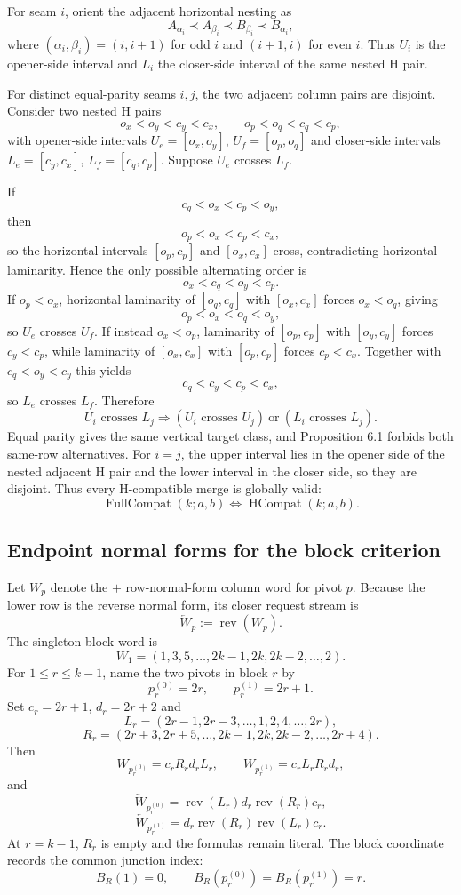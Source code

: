 \documentclass[11pt]{article}
\theoremstyle{definition}
\theoremstyle{remark}
\begin{document}
For seam \(i\), orient the adjacent horizontal nesting as \[
A_{\alpha_i}\prec A_{\beta_i}\prec B_{\beta_i}\prec B_{\alpha_i},
\] where \((\alpha_i,\beta_i)=(i,i+1)\) for odd \(i\) and \((i+1,i)\)
for even \(i\). Thus \(U_i\) is the opener-side interval and \(L_i\) the
closer-side interval of the same nested H pair.

For distinct equal-parity seams \(i,j\), the two adjacent column pairs
are disjoint. Consider two nested H pairs \[
o_x<o_y<c_y<c_x,
\qquad
o_p<o_q<c_q<c_p,
\] with opener-side intervals \(U_e=[o_x,o_y]\), \(U_f=[o_p,o_q]\) and
closer-side intervals \(L_e=[c_y,c_x]\), \(L_f=[c_q,c_p]\). Suppose
\(U_e\) crosses \(L_f\).

If \[
c_q<o_x<c_p<o_y,
\] then \[
o_p<o_x<c_p<c_x,
\] so the horizontal intervals \([o_p,c_p]\) and \([o_x,c_x]\) cross,
contradicting horizontal laminarity. Hence the only possible alternating
order is \[
o_x<c_q<o_y<c_p.
\] If \(o_p<o_x\), horizontal laminarity of \([o_q,c_q]\) with
\([o_x,c_x]\) forces \(o_x<o_q\), giving \[
o_p<o_x<o_q<o_y,
\] so \(U_e\) crosses \(U_f\). If instead \(o_x<o_p\), laminarity of
\([o_p,c_p]\) with \([o_y,c_y]\) forces \(c_y<c_p\), while laminarity of
\([o_x,c_x]\) with \([o_p,c_p]\) forces \(c_p<c_x\). Together with
\(c_q<o_y<c_y\) this yields \[
c_q<c_y<c_p<c_x,
\] so \(L_e\) crosses \(L_f\). Therefore \[
U_i\text{ crosses }L_j
\Longrightarrow
(U_i\text{ crosses }U_j)\ \text{or}\ (L_i\text{ crosses }L_j).
\] Equal parity gives the same vertical target class, and Proposition
6.1 forbids both same-row alternatives. For \(i=j\), the upper interval
lies in the opener side of the nested adjacent H pair and the lower
interval in the closer side, so they are disjoint. Thus every
H-compatible merge is globally valid: \[
\operatorname{FullCompat}(k;a,b)
\iff
\operatorname{HCompat}(k;a,b).
\]

\subsection{Endpoint normal forms for the block
criterion}\label{e.4.-endpoint-normal-forms-for-the-block-criterion}

Let \(W_p\) denote the \(+\) row-normal-form column word for pivot
\(p\). Because the lower row is the reverse normal form, its closer
request stream is \[
\overleftarrow{W}_p:=\operatorname{rev}(W_p).
\] The singleton-block word is \[
W_1=(1,3,5,\ldots,2k-1,2k,2k-2,\ldots,2).
\] For \(1\le r\le k-1\), name the two pivots in block \(r\) by \[
p_r^{(0)}=2r,
\qquad
p_r^{(1)}=2r+1.
\] Set \(c_r=2r+1\), \(d_r=2r+2\) and \[
L_r=(2r-1,2r-3,\ldots,1,2,4,\ldots,2r),
\] \[
R_r=(2r+3,2r+5,\ldots,2k-1,2k,2k-2,\ldots,2r+4).
\] Then \[
W_{p_r^{(0)}}=c_rR_rd_rL_r,
\qquad
W_{p_r^{(1)}}=c_rL_rR_rd_r,
\] and \[
\overleftarrow{W}_{p_r^{(0)}}=
\operatorname{rev}(L_r)d_r\operatorname{rev}(R_r)c_r,
\] \[
\overleftarrow{W}_{p_r^{(1)}}=
d_r\operatorname{rev}(R_r)\operatorname{rev}(L_r)c_r.
\] At \(r=k-1\), \(R_r\) is empty and the formulas remain literal. The
block coordinate records the common junction index: \[
B_R(1)=0,
\qquad
B_R(p_r^{(0)})=B_R(p_r^{(1)})=r.
\]
\end{document}
